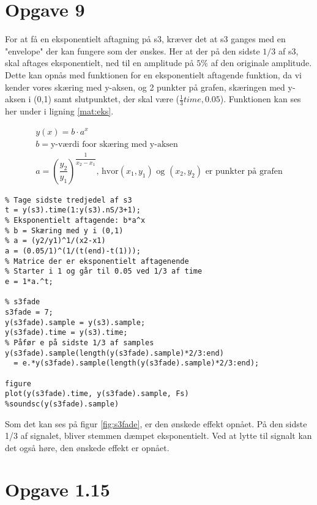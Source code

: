 \documentclass[../main.tex]{subfiles}
\begin{document}
\section{Opgave 9}

For at få en eksponentielt aftagning på s3, kræver det at s3 ganges med en "envelope" der kan fungere som der ønskes. Her at der på den sidste \( 1 /3 \) af s3, skal aftages eksponentielt, ned til en amplitude på \( 5\% \) af den originale amplitude. Dette kan opnås med funktionen for en eksponentielt aftagende funktion, da vi kender vores skæring med y-aksen, og 2 punkter på grafen, skæringen med y-aksen i (0,1) samt slutpunktet, der skal være (\(\frac{1}{3}time, 0.05\)). Funktionen kan ses her under i ligning \ref{mat:eks}. 

\begin{gather}
  y(x) = b \cdot a^x \label{mat:eks}\\
  b = \text{y-værdi foor skæring med y-aksen} \\
  a = \left(\dfrac{y_2}{y_1}\right)^{ \dfrac{1}{x_2-x_1}} \text{, hvor} (x_1,y_1) \text{ og }  (x_2,y_2)  \text{ er punkter på grafen}
\end{gather}

\begin{lstlisting}[caption={Fade out af s3}label=lst:s3fade]
%% Exercise 9
% Tage sidste tredjedel af s3
t = y(s3).time(1:y(s3).nS/3+1);
% Eksponentielt aftagende: b*a^x
% b = Skæring med y i (0,1)
% a = (y2/y1)^1/(x2-x1)
a = (0.05/1)^(1/(t(end)-t(1)));
% Matrice der er eksponentielt aftagenende
% Starter i 1 og går til 0.05 ved 1/3 af time
e = 1*a.^t;

% s3fade
s3fade = 7;
y(s3fade).sample = y(s3).sample;
y(s3fade).time = y(s3).time;
% Påfør e på sidste 1/3 af samples
y(s3fade).sample(length(y(s3fade).sample)*2/3:end) 
  = e.*y(s3fade).sample(length(y(s3fade).sample)*2/3:end);

figure
plot(y(s3fade).time, y(s3fade).sample, Fs)
%soundsc(y(s3fade).sample)
\end{lstlisting}

Som det kan ses på figur \ref{fig:s3fade}, er den ønskede effekt opnået. På den sidste 1/3 af signalet, bliver stemmen dæmpet eksponentielt. Ved at lytte til signalt kan det også høre, den ønskede effekt er opnået.




\section{Opgave 1.15}
\end{document}
